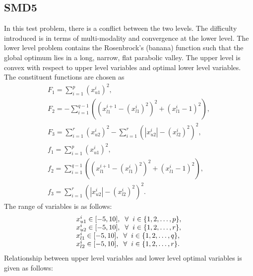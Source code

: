 \documentclass[twoside]{article}
\begin{document}
\subsection{SMD5}
In this test problem, there is a conflict between the two levels. The difficulty introduced is in terms of multi-modality and convergence at the lower level. The lower level problem contains the Rosenbrock's (banana) function such that the global optimum lies in a long, narrow, flat parabolic valley. 
The upper level is convex with respect to upper level variables and optimal lower level variables. The constituent functions are chosen as
\begin{equation}
\begin{array}{l}
F_1 = \sum_{i=1}^{p} (x_{u1}^{i})^2,\\
F_2 = - \sum_{i=1}^{q-1} \left( \left(x_{l1}^{i+1} - \left(x_{l1}^{i}\right)^2\right)^2 + \left(x_{l1}^{i} - 1\right)^2 \right),\\
F_3 = \sum_{i=1}^{r} (x_{u2}^{i})^2 - \sum_{i=1}^{r} (|x_{u2}^{i}| - (x_{l2}^{i})^2)^2,\\
f_1 = \sum_{i=1}^{p} (x_{u1}^{i})^2,\\
f_2 = \sum_{i=1}^{q-1} \left( \left(x_{l1}^{i+1} - \left(x_{l1}^{i}\right)^2\right)^2 + \left(x_{l1}^{i} - 1\right)^2 \right),\\
f_3 = \sum_{i=1}^{r} (|x_{u2}^{i}| - (x_{l2}^{i})^2)^2.
\end{array}
\end{equation}
The range of variables is as follows:
\begin{equation}
\begin{array}{l}
x_{u1}^{i} \in [-5,10], \hspace{2mm} \forall \hspace{2mm} i \in \{1,2,\ldots,p\},\\
x_{u2}^{i} \in [-5,10], \hspace{2mm} \forall \hspace{2mm} i \in \{1,2,\ldots,r\},\\
x_{l1}^{i} \in [-5,10], \hspace{2mm} \forall \hspace{2mm} i \in \{1,2,\ldots,q\},\\
x_{l2}^{i} \in [-5,10], \hspace{2mm} \forall \hspace{2mm} i \in \{1,2,\ldots,r\}.
\end{array}
\end{equation}
Relationship between upper level variables and lower level optimal variables is given as follows:
\end{document}
